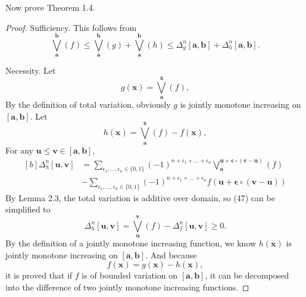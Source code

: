 \documentclass{ijclclp}
\begin{document}
Now prove Theorem 1.4.
\begin{proof}
    Sufficiency. This follows from
    \[\bigvee_{\boldsymbol{a}}^{\boldsymbol{b}}(f)\leq\bigvee_{\boldsymbol{a}}^{\boldsymbol{b}}(g)+\bigvee_{\boldsymbol{a}}^{\boldsymbol{b}}(h)\leq\Delta_g^n [\boldsymbol{a},\boldsymbol{b}]+\Delta_h^n [\boldsymbol{a},\boldsymbol{b}].\]
    
    Necessity. Let
    \[g(\boldsymbol{x})=\bigvee_{\boldsymbol{a}}^{\boldsymbol{x}}(f),\]
    By the definition of total variation, obviously \(g\) is jointly monotone increasing on \([\boldsymbol{a},\boldsymbol{b}]\). Let
    \[h(\boldsymbol{x})=\bigvee_{\boldsymbol{a}}^{\boldsymbol{x}}(f)-f(\boldsymbol{x}),\]
    For any \(\boldsymbol{u}\leq\boldsymbol{v}\in[\boldsymbol{a},\boldsymbol{b}]\),
    \begin{equation}
        \begin{aligned}[b]
             \Delta_h^n[\boldsymbol{u},\boldsymbol{v}]
             &=\sum_{\epsilon_1,\dots,\epsilon_n\in\{0,1\}}(-1)^{n+\epsilon_1+\dots+\epsilon_n}\bigvee_{\boldsymbol{a}}^{\boldsymbol{u}+\boldsymbol{\epsilon}\circ(\boldsymbol{v}-\boldsymbol{u})}(f)\\
             &-\sum_{\epsilon_1,\dots,\epsilon_n\in\{0,1\}}(-1)^{n+\epsilon_1+\dots+\epsilon_n}f(\boldsymbol{u}+\boldsymbol{\epsilon}\circ(\boldsymbol{v}-\boldsymbol{u}))
        \end{aligned}
    \end{equation}
    By Lemma 2.3, the total variation is additive over domain, so (47) can be simplified to
    \[\Delta_h^n[\boldsymbol{u},\boldsymbol{v}]=\bigvee_{\boldsymbol{u}}^{\boldsymbol{v}}(f)-\Delta_f^n[\boldsymbol{u},\boldsymbol{v}]\geq0.\]
    By the definition of a jointly monotone increasing function, we know \(h(\boldsymbol{x})\) is jointly monotone increasing on \([\boldsymbol{a},\boldsymbol{b}]\). And because
    \[f(\boldsymbol{x})=g(\boldsymbol{x})-h(\boldsymbol{x}),\]
    it is proved that if \(f\) is of bounded variation on \([\boldsymbol{a},\boldsymbol{b}]\), it can be decomposed into the difference of two jointly monotone increasing functions.
\end{proof}
\end{document}
